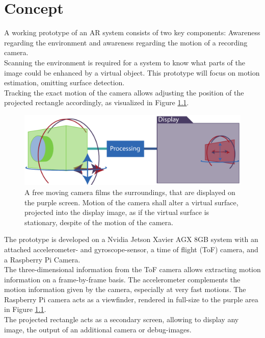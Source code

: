 \chapter{Concept}
\label{sec:Concept}
A working prototype of an AR system consists of two key components: Awareness regarding the environment and awareness regarding the motion of a recording camera.\\
Scanning the environment is required for a system to know what parts of the image could be enhanced by a virtual object. This prototype will focus on motion estimation, omitting surface detection.\\
Tracking the exact motion of the camera allows adjusting the position of the projected rectangle accordingly, as visualized in Figure \ref{fig:HW_concept}.
\begin{figure}[H]
    \centering
    \includegraphics[width=1.0\textwidth]{images/concept_image.pdf}
    \caption{A free moving camera films the surroundings, that are displayed on the purple screen. Motion of the camera shall alter a virtual surface, projected into the display image, as if the virtual surface is stationary, despite of the motion of the camera.}
    \label{fig:HW_concept}
\end{figure}
The prototype is developed on a Nvidia Jetson Xavier AGX 8GB system with an attached accelerometer- and gyroscope-sensor, a time of flight (ToF) camera, and a Raspberry Pi Camera.\\
The three-dimensional information from the ToF camera allows extracting motion information on a frame-by-frame basis. The accelerometer complements the motion information given by the camera, especially at very fast motions. The Raspberry Pi camera acts as a viewfinder, rendered in full-size to the purple area in Figure \ref{fig:HW_concept}.\\
The projected rectangle acts as a secondary screen, allowing to display any image, the output of an additional camera or debug-images.
